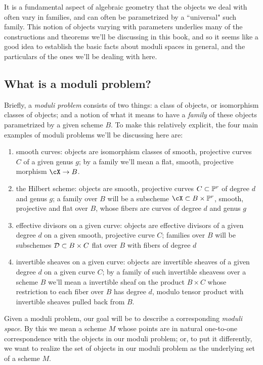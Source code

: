 It is a fundamental aspect of algebraic geometry that the objects we deal with often vary in families, and can often be parametrized by a ``universal" such family. This notion of objects varying with parameters underlies many of the constructions and theorems we'll be discussing in this book, and so it seems like a good idea to establish the basic facts about moduli spaces in general, and the particulars of the ones we'll be dealing with here. 

\subsection{What is a moduli problem?}

Briefly, a \emph{moduli problem} consists of two things: a class of objects, or isomorphism classes of objects; and a notion of what it means to have a \emph{family} of these objects parametrized by a given scheme $B$. To make this relatively explicit, the four main examples of moduli problems we'll be discussing here are:

\begin{enumerate}
\item  smooth curves: objects are isomorphism classes  of smooth, projective curves $C$ of a given genus $g$; by a family we'll mean a flat, smooth, projective morphism $\cX \to B$.

\item the Hilbert scheme: objects are smooth, projective curves $C \subset \PP^r$ of degree $d$ and genus $g$; a family over $B$ will be a subscheme $\cX \subset B \times \PP^r$, smooth, projective and flat over $B$, whose fibers are curves of degree $d$ and genus $g$

\item effective divisors on a given curve: objects are effective divisors of a given degree $d$ on a given smooth, projective curve $C$; families over $B$ will be subschemes $\cD \subset B \times C$ flat over $B$ with fibers of degree $d$

\item invertible sheaves on a given curve: objects are invertible sheaves of a given degree $d$ on a given curve $C$; by a family of such invertible sheavess over a scheme $B$ we'll mean a invertible sheaf on the product $B \times C$ whose restriction to each fiber over $B$ has degree $d$, modulo tensor product with invertible sheaves pulled back from $B$.
\end{enumerate}

Given a moduli problem, our goal will be to describe a corresponding \emph{moduli space}. By this we mean a scheme $M$ whose points are in natural one-to-one correspondence with the objects in our moduli problem; or, to put it differently, we want to realize the set of objects in our moduli problem as the underlying set of a scheme $M$.

